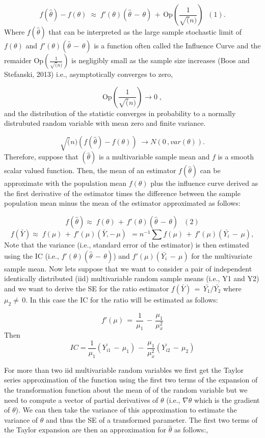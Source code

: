 \documentclass[
]{article}
\begin{document}
\[f(\hat\theta)-f(\theta)\;\approx\;f'(\theta)(\hat\theta\,-\,\theta)\,+\,\text{Op}(\frac{1}{\sqrt(n)}) \;\;(1).\]
Where \(f(\hat\theta)\) that can be interpreted as the large sample
stochastic limit of \(f(\theta)\) and
\(f'(\theta)(\hat\theta\,-\,\theta)\) is a function often called the
Influence Curve and the remaider \(\text{Op}(\frac{1}{\sqrt(n)})\) is
negligibly small as the sample size increases (Boos and Stefanski, 2013)
i.e., asymptotically converges to zero,

\[\text{Op}(\frac{1}{\sqrt(n)}) \rightarrow 0 \;,\] and the distribution
of the statistic converges in probability to a normally distrubuted
random variable with mean zero and finite variance.

\[\sqrt(n)\left(f(\hat\theta)-f(\theta)\right)\; \rightarrow N(0\,,var(\theta)).\]
Therefore, suppose that \((\hat\theta)\) is a multivariable sample mean
and \(f\) is a smooth scalar valued function. Then, the mean of an
estimator \(f(\hat\theta)\) can be approximate with the population mean
\(f(\theta)\) plus the influence curve derived as the first derivative
of the estimator times the difference between the sample population mean
minus the mean of the estimator approximated as follows:

\[f(\hat\theta)\approx\;f(\theta)\,+\,f'(\theta)(\hat\theta\,-\,\theta)\, \;\;(2)\]
\[f(\bar{Y})\approx\;f(\mu)\,+\,f'(\mu)(\bar{Y},-\,\mu)\, \;= n^{-1}\sum{f(\mu)\,+\,f'(\mu)(\bar{Y_{i}}\,-\,\mu)},\]
Note that the variance (i.e., standard error of the estimator) is then
estimated using the IC (i.e., \(f'(\theta)(\hat\theta\,-\,\theta)\)) and
\(f'(\mu)(\bar{Y_{i}}\,-\,\mu)\) for the multivariate sample mean. Now
lets suppose that we want to consider a pair of independent identically
distributed (iid) multivariable random sample means (i.e., Y1 and Y2)
and we want to derive the SE for the ratio estimator
\(f(\bar{Y})\,=\,\bar{Y_{1}}/\bar{Y_{2}}\) where \(\mu_{2}\neq\,0\). In
this case the IC for the ratio will be estimated as follows:

\[f'(\mu)\,=\, \frac{1}{\mu_{1}}\,-\,\frac{\mu_{1}}{\mu_{x}^{2}}\] Then
\[IC = \frac{1}{\mu_{1}}{}(\bar{Y_{i1}}\,-\,\mu_{1})\,-\,\frac{\mu_{1}}{\mu_{x}^{2}}(\bar{Y_{i2}}\,-\,\mu_{2})\]

For more than two iid multivariable random variables we first get the
Taylor series approximation of the function using the first two terms of
the expansion of the transformation function about the mean of of the
random variable but we need to compute a vector of partial derivatives
of \(\theta\) (i.e., \(\nabla \theta\) which is the gradient of
\(\theta\)). We can then take the variance of this approximation to
estimate the variance of \(\theta\) and thus the SE of a transformed
parameter. The first two terms of the Taylor expansion are then an
approximation for \(\hat\theta\) as follows:,
\end{document}
